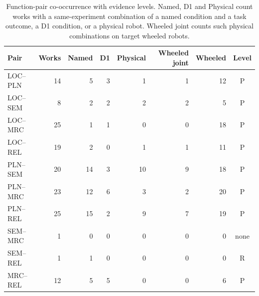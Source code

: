 \begin{table}[!t]
\centering
\caption{Function-pair co-occurrence with evidence levels. Named, D1 and Physical count works with a same-experiment combination of a named condition and a task outcome, a D1 condition, or a physical robot. Wheeled joint counts such physical combinations on target wheeled robots.}
\label{tab:cooccurrence}
\surveytableformat
\setlength{\tabcolsep}{3.4pt}
\begin{tabularx}{\linewidth}{@{}Yrrrrrrc@{}}
\toprule
\textbf{Pair} & \textbf{Works} & \textbf{Named} & \textbf{D1} & \textbf{Physical} & \textbf{Wheeled joint} & \textbf{Wheeled} & \textbf{Level} \\
\midrule
LOC--PLN & 14 & 5 & 3 & 1 & 1 & 12 & P \\
LOC--SEM & 8 & 2 & 2 & 2 & 2 & 5 & P \\
LOC--MRC & 25 & 1 & 1 & 0 & 0 & 18 & P \\
LOC--REL & 19 & 2 & 0 & 1 & 1 & 11 & P \\
PLN--SEM & 20 & 14 & 3 & 10 & 9 & 18 & P \\
PLN--MRC & 23 & 12 & 6 & 3 & 2 & 20 & P \\
PLN--REL & 25 & 15 & 2 & 9 & 7 & 19 & P \\
SEM--MRC & 1 & 0 & 0 & 0 & 0 & 0 & none \\
SEM--REL & 1 & 1 & 0 & 0 & 0 & 0 & R \\
MRC--REL & 12 & 5 & 5 & 0 & 0 & 6 & P \\
\bottomrule
\end{tabularx}
\end{table}
